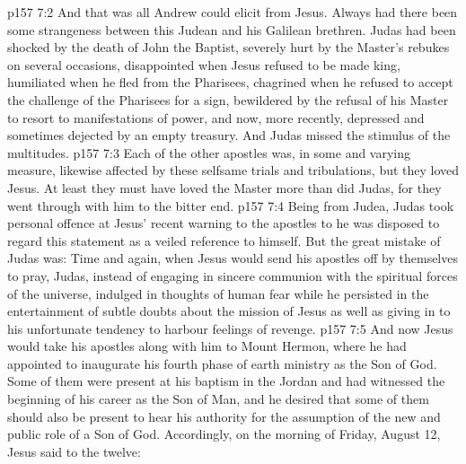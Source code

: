 \vs p157 7:2 And that was all Andrew could elicit from Jesus. Always had there been some strangeness between this Judean and his Galilean brethren. Judas had been shocked by the death of John the Baptist, severely hurt by the Master’s rebukes on several occasions, disappointed when Jesus refused to be made king, humiliated when he fled from the Pharisees, chagrined when he refused to accept the challenge of the Pharisees for a sign, bewildered by the refusal of his Master to resort to manifestations of power, and now, more recently, depressed and sometimes dejected by an empty treasury. And Judas missed the stimulus of the multitudes.
\vs p157 7:3 Each of the other apostles was, in some and varying measure, likewise affected by these selfsame trials and tribulations, but they loved Jesus. At least they must have loved the Master more than did Judas, for they went through with him to the bitter end.
\vs p157 7:4 Being from Judea, Judas took personal offence at Jesus’ recent warning to the apostles to  he was disposed to regard this statement as a veiled reference to himself. But the great mistake of Judas was: Time and again, when Jesus would send his apostles off by themselves to pray, Judas, instead of engaging in sincere communion with the spiritual forces of the universe, indulged in thoughts of human fear while he persisted in the entertainment of subtle doubts about the mission of Jesus as well as giving in to his unfortunate tendency to harbour feelings of revenge.
\vs p157 7:5 \pc And now Jesus would take his apostles along with him to Mount Hermon, where he had appointed to inaugurate his fourth phase of earth ministry as the Son of God. Some of them were present at his baptism in the Jordan and had witnessed the beginning of his career as the Son of Man, and he desired that some of them should also be present to hear his authority for the assumption of the new and public role of a Son of God. Accordingly, on the morning of Friday, August 12, Jesus said to the twelve: 
\quizlink
